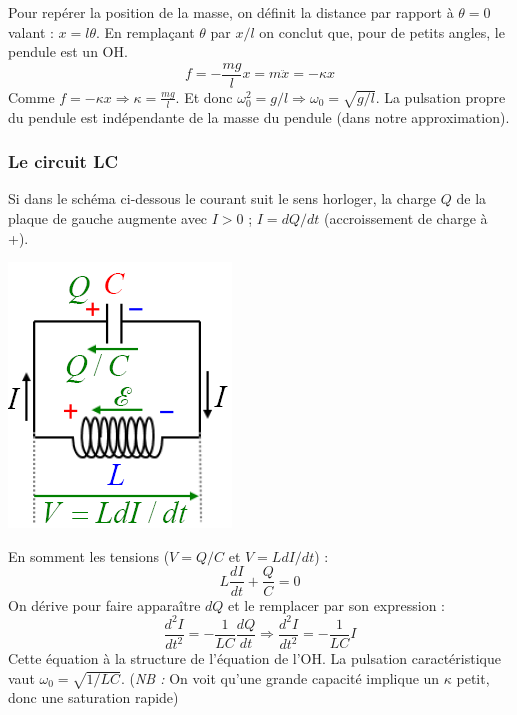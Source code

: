 \documentclass	[11pt, a4paper, openany]{book}
\begin{document}
Pour repérer la position de la masse, on définit la distance par rapport à $\theta = 0$ valant : $x = l\theta$. En remplaçant $\theta$ par $x/l$ on conclut que, pour de petits angles, le pendule est un OH.
\begin{equation}
f = -\frac{mg}{l}x = m\ddot{x} = -\kappa x
\end{equation}
Comme $f = -\kappa x \Rightarrow \kappa = \frac{mg}{l}$. Et donc $\omega_0^2 = g/l \Rightarrow \omega_0 = \sqrt{g/l}$. La pulsation propre du pendule est indépendante de la masse du pendule (dans notre approximation).

\subsubsection{Le circuit LC}
Si dans le schéma ci-dessous le courant suit le sens horloger, la charge $Q$ de la plaque de gauche augmente avec $I > 0$ ; $I = dQ/dt$ (accroissement de charge à +).

\begin{center}
\includegraphics[scale=0.45]{oo/image14.png}
\end{center}

 En somment les tensions ($V = Q/C$ et $V = L dI/dt$) :
\begin{equation}
L\frac{dI}{dt} + \frac{Q}{C} = 0
\end{equation}
On dérive pour faire apparaître $dQ$ et le remplacer par son expression :
\begin{equation}
\frac{d^2I}{dt^2} = -\frac{1}{LC}\frac{dQ}{dt} \Rightarrow \frac{d^2I}{dt^2} = - \frac{1}{LC}I
\end{equation}
Cette équation à la structure de l'équation de l'OH. La pulsation caractéristique vaut $\omega_0 = \sqrt{1/LC}$. (\textit{NB :} On voit qu'une grande capacité implique un $\kappa$ petit, donc une saturation rapide)
\end{document}

